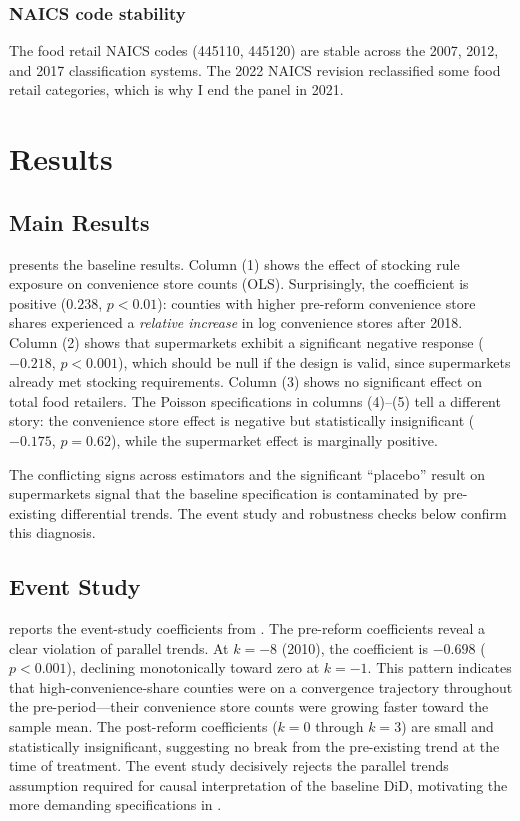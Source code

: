 \documentclass[12pt]{article}
\begin{document}
\subsubsection*{NAICS code stability} The food retail NAICS codes (445110, 445120) are stable across the 2007, 2012, and 2017 classification systems. The 2022 NAICS revision reclassified some food retail categories, which is why I end the panel in 2021.


\section{Results}
\label{sec:results}

\subsection{Main Results}



 presents the baseline results. Column (1) shows the effect of stocking rule exposure on convenience store counts (OLS). Surprisingly, the coefficient is positive ($0.238$, $p < 0.01$): counties with higher pre-reform convenience store shares experienced a \textit{relative increase} in log convenience stores after 2018. Column (2) shows that supermarkets exhibit a significant negative response ($-0.218$, $p < 0.001$), which should be null if the design is valid, since supermarkets already met stocking requirements. Column (3) shows no significant effect on total food retailers. The Poisson specifications in columns (4)--(5) tell a different story: the convenience store effect is negative but statistically insignificant ($-0.175$, $p = 0.62$), while the supermarket effect is marginally positive.

The conflicting signs across estimators and the significant ``placebo'' result on supermarkets signal that the baseline specification is contaminated by pre-existing differential trends. The event study and robustness checks below confirm this diagnosis.

\subsection{Event Study}



 reports the event-study coefficients from . The pre-reform coefficients reveal a clear violation of parallel trends. At $k = -8$ (2010), the coefficient is $-0.698$ ($p < 0.001$), declining monotonically toward zero at $k = -1$. This pattern indicates that high-convenience-share counties were on a convergence trajectory throughout the pre-period---their convenience store counts were growing faster toward the sample mean. The post-reform coefficients ($k = 0$ through $k = 3$) are small and statistically insignificant, suggesting no break from the pre-existing trend at the time of treatment. The event study decisively rejects the parallel trends assumption required for causal interpretation of the baseline DiD, motivating the more demanding specifications in .
\end{document}
